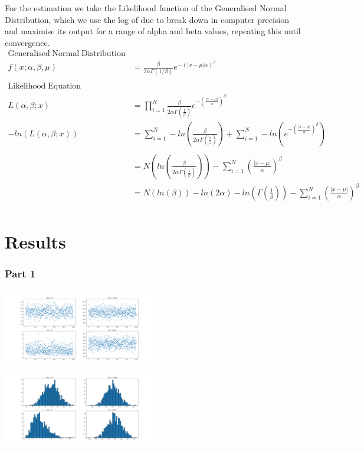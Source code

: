 \documentclass[11pt]{article}
\begin{document}
\begin{preview}
For the estimation we take the Likelihood function of the Generalised Normal Distribution, which we use the log of due to break down in computer precision and maximise its output for a range of alpha and beta values, repeating this until convergence.
\begin{align*}
        \mathrm{Generalised\;Normal\;Distribution} \\
        f(x;\alpha,\beta,\mu) &= \frac{\beta}{2\alpha\Gamma(1/\beta)}e^{-(|x-\mu|\alpha)^\beta}\\ \\
        \mathrm{Likelihood\;Equation}\\ 
        L(\alpha, \beta ; x) &= \prod^N_{i=1} \frac{\beta}{2\alpha\Gamma(\frac{1}{\beta})} e^{-(\frac{|x-\mu|}{\alpha})^\beta}\\
        -ln (L(\alpha, \beta ; x)) &= \sum^N_{i=1} -ln\left(\frac{\beta}{2\alpha\Gamma(\frac{1}{\beta})}\right) + \sum^N_{i=1} -ln(e^{-(\frac{|x-\mu|}{\alpha})^\beta})\\\\
         &= N\left(ln\left(\frac{\beta}{2\alpha\Gamma(\frac{1}{\beta})}\right)\right) - \sum^N_{i=1} \left( \frac{|x-\mu|}{\alpha}\right)^\beta \\
         &= N(ln(\beta)) - ln(2\alpha) - ln(\Gamma(\frac{1}{\beta})) - \sum^N_{i=1} \left( \frac{|x-\mu|}{\alpha}\right)^\beta\\
\end{align*} 

\section{Results}
\subsubsection*{Part 1}
\includegraphics[width = 0.5\textwidth]{inc/p1_scatter.png}
\includegraphics[width = 0.5\textwidth]{inc/p1_hist.png}


\end{preview}
\end{document}
